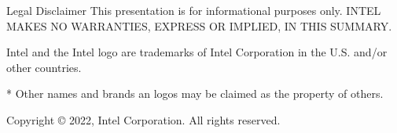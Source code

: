 
\begin{frame}[c]{Legal Disclaimer}
  This presentation is for informational purposes only.
  INTEL MAKES NO WARRANTIES, EXPRESS OR IMPLIED, IN THIS SUMMARY.

  \vspace{\baselineskip}
  Intel and the Intel logo are trademarks of Intel Corporation in the
  U.S. and/or other countries.

  \vspace{\baselineskip}
  * Other names and brands an logos may be claimed as the property of others.

  \vspace{\baselineskip}
  Copyright © 2022, Intel Corporation. All rights reserved.
\end{frame}
